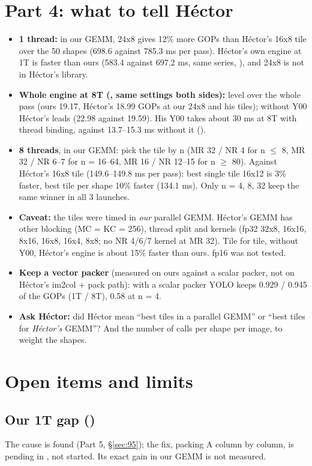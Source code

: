 \section{Part 4: what to tell H\'ector}
\begin{itemize}\setlength\itemsep{2pt}
\item \textbf{1 thread:} in our GEMM, 24x8 gives 12\% more GOPs than H\'ector's 16x8 tile over the 50 shapes (698.6 against 785.3 ms per pass). H\'ector's own engine at 1T is faster than ours (583.4 against 697.2 ms, same series, ), and 24x8 is not in H\'ector's library.
\item \textbf{Whole engine at 8T (, same settings both sides):} level over the whole pass (ours 19.17, H\'ector's 18.99 GOPs at our 24x8 and his tiles); without Y00 H\'ector's leads (22.98 against 19.59). His Y00 takes about 30 ms at 8T with thread binding, against 13.7--15.3 ms without it ().
\item \textbf{8 threads}, in our GEMM: pick the tile by n (MR 32 / NR 4 for n $\le$ 8, MR 32 / NR 6--7 for n = 16--64, MR 16 / NR 12--15 for n $\ge$ 80). Against H\'ector's 16x8 tile (149.6--149.8 ms per pass): best single tile 16x12 is 3\% faster, best tile per shape 10\% faster (134.1 ms). Only n = 4, 8, 32 keep the same winner in all 3 launches.
\item \textbf{Caveat:} the tiles were timed in \emph{our} parallel GEMM. H\'ector's GEMM has other blocking (MC = KC = 256), thread split and kernels (fp32 32x8, 16x16, 8x16, 16x8, 16x4, 8x8; no NR 4/6/7 kernel at MR 32). Tile for tile, without Y00, H\'ector's engine is about 15\% faster than ours. fp16 was not tested.
\item \textbf{Keep a vector packer} (measured on ours against a scalar packer, not on H\'ector's im2col + pack path): with a scalar packer YOLO keeps 0.929 / 0.945 of the GOPs (1T / 8T), 0.58 at n = 4.
\item \textbf{Ask H\'ector:} did H\'ector mean ``best tiles in a parallel GEMM'' or ``best tiles for \emph{H\'ector's} GEMM''? And the number of calls per shape per image, to weight the shapes.
\end{itemize}



\section{Open items and limits}\label{sec:open}
\subsection*{Our 1T gap ()}
The cause is found (Part 5, \S\ref{sec:95}); the fix, packing A column by column, is pending in , not started. Its exact gain in our GEMM is not measured.

